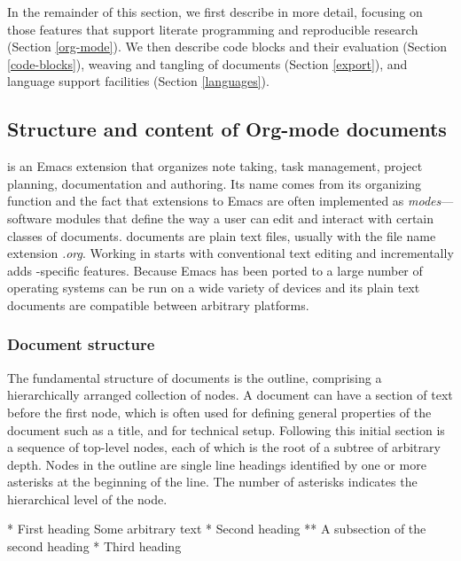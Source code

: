 \documentclass[article,shortnames]{jss}
\begin{document}
In the remainder of this section, we first describe  in more
detail, focusing on those features that support literate programming
and reproducible research (Section \ref{org-mode}).  We then describe
code blocks and their evaluation (Section \ref{code-blocks}), weaving
and tangling of  documents (Section \ref{export}), and
language support facilities (Section \ref{languages}).
\subsection{Structure and content of Org-mode documents}
\label{sec-3-1}
\label{org-mode}


 is an Emacs extension that organizes note taking, task
management, project planning, documentation and authoring.  Its name
comes from its organizing function and the fact that extensions to
Emacs are often implemented as \emph{modes}---software modules that define
the way a user can edit and interact with certain classes of
documents.   documents are plain text files, usually with the
file name extension \emph{.org}.  Working in  starts with
conventional text editing and incrementally adds -specific
features.  Because Emacs has been ported to a large number of operating systems
 can be run on a wide variety of devices and its plain text
documents are compatible between arbitrary platforms.
\subsubsection{Document structure}
\label{sec-3-1-1}


The fundamental structure of  documents is the outline,
comprising a hierarchically arranged collection of nodes.  A
document can have a section of text before the first node, which
is often used for defining general properties of the document
such as a title, and for technical setup.  Following this initial
section is a sequence of top-level nodes, each of which is the root
of a subtree of arbitrary depth.
Nodes in the outline are single line headings identified by one or
more asterisks at the beginning of the line.  The number of asterisks
indicates the hierarchical level of the node.


\begin{Code}
* First heading
    Some arbitrary text
* Second heading
** A subsection of the second heading
* Third heading
\end{Code}
\end{document}
